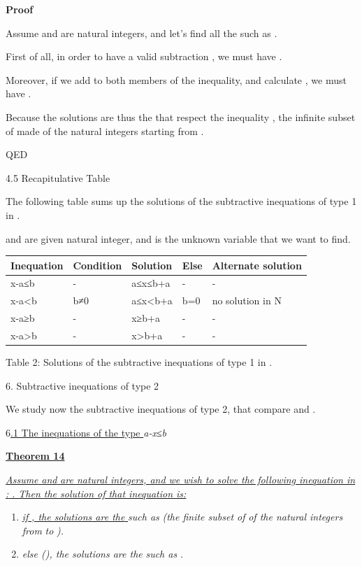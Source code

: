 \documentclass{article}
\providecommand{\tightlist}{%
  \setlength{\itemsep}{0pt}\setlength{\parskip}{0pt}}
\begin{document}
\textbf{Proof}

Assume  and  are natural integers, and let’s find all the  such as .

First of all, in order to have a valid subtraction , we must have .

Moreover, if we add  to both members of the inequality, and calculate , we must have .

Because  the solutions are thus the  that respect the inequality , the infinite subset of  made of the natural integers starting from .

QED

4.5 Recapitulative Table

The following table sums up the solutions of the subtractive inequations of type 1 in .

 and  are given natural integer, and  is the unknown variable that we want to find.

\begin{table}[ht]
\centering
\begin{tabular}{@{}lllll@{}}
\toprule
Inequation & Condition & Solution & Else & Alternate solution \\
\midrule
x-a≤b & - & a≤x≤b+a & - & - \\
x-a<b & b≠0 & a≤x<b+a & b=0 & no solution in N \\
x-a≥b & - & x≥b+a & - & - \\
x-a>b & - & x>b+a & - & - \\
\bottomrule
\end{tabular}
\end{table}



Table 2: Solutions of the subtractive inequations of type 1 in .





6. Subtractive inequations of type 2

We study now the subtractive inequations of type 2, that compare  and .

6\ul{.1 The inequations of the type }\emph{a-x}\emph{≤}\emph{b}

\ul{\textbf{Theorem 14}}

\ul{\emph{Assume }}\ul{\emph{ and }}\ul{\emph{ are natural integers, and we wish to solve the following inequation in }}\ul{\emph{: }}\ul{\emph{. Then the solution of that inequation is:}}

\begin{enumerate}
\tightlist
\item \ul{\emph{if }}\ul{\emph{, the solutions are the }}\emph{ such as }\emph{ (the finite subset of }\emph{ of the natural integers from }\emph{ to }\emph{).}
\item \emph{else (}\emph{), the solutions are the }\emph{ such as }\emph{.}
\end{enumerate}
\end{document}
